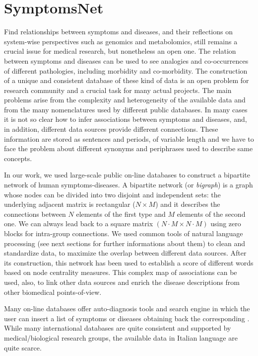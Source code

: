 \documentclass{standalone}
\begin{document}
\section[SymptomsNet]{SymptomsNet}\label{chimera:symptomsnet}

Find relationships between symptoms and diseases, and their reflections on system-wise perspectives such as genomics and metabolomics, still remains a crucial issue for medical research, but nonetheless an open one.
The relation between symptoms and diseases can be used to see analogies and co-occurrences of different pathologies, including morbidity and co-morbidity.
The construction of a unique and consistent database of these kind of data is an open problem for research community and a crucial task for many actual projects.
The main problems arise from the complexity and heterogeneity of the available data and from the many nomenclatures used by different public databases.
In many cases it is not so clear how to infer associations between symptoms and diseases, and, in addition, different data sources provide different connections.
These information are stored as sentences and periods, of variable length and we have to face the problem about different synonyms and periphrases used to describe same concepts.

In our work, we used large-scale public on-line databases to construct a bipartite network of human symptoms-diseases.
A bipartite network (or \emph{bigraph}) is a graph whose nodes can be divided into two disjoint and independent sets: the underlying adjacent matrix is rectangular ($N\times M$) and it describes the connections between $N$ elements of the first type and $M$ elements of the second one.
We can always lead back to a square matrix $(N\cdot M \times N\cdot M)$ using zero blocks for intra-group connections.
We used common tools of natural language processing (see next sections for further informations about them) to clean and standardize data, to maximize the overlap between different data sources.
After its construction, this network has been used to establish a score of different words based on node centrality measures.
This complex map of associations can be used, also, to link other data sources and enrich the disease descriptions from other biomedical points-of-view.

Many on-line databases offer auto-diagnosis tools and search engine in which the user can insert a list of symptoms or diseases  obtaining back the corresponding .
While many international databases are quite consistent and supported by medical/biological research groups, the available data in Italian language are quite scarce.
\end{document}
